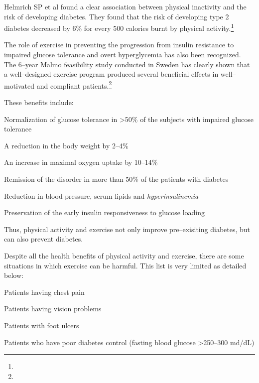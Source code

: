 Helmrich SP et al found a clear association between physical inactivity and the risk of developing diabetes. They found that the risk of developing type 2 diabetes decreased by 6\% for every 500 calories burnt by physical activity.\footnote{}

The role of exercise in preventing the progression from insulin resistance to impaired glucose tolerance and overt hyperglycemia has also been recognized. The 6–year Malmo feasibility study conducted in Sweden has clearly shown that a well–designed exercise program produced several beneficial effects in well–motivated and compliant patients.\footnote{}

These benefits include:

\item Normalization of glucose tolerance in \textgreater  50\% of the subjects with impaired glucose tolerance

 \item A reduction in the body weight by 2–4\%

 \item An increase in maximal oxygen uptake by 10–14\%

 \item Remission of the disorder in more than 50\% of the patients with diabetes

 \item Reduction in blood pressure, serum lipids and \textit{hyperinsulinemia}

 \item Preservation of the early insulin responsiveness to glucose loading

Thus, physical activity and exercise not only improve pre–exisiting diabetes, but can also prevent diabetes.


Despite all the health benefits of physical activity and exercise, there are some situations in which exercise can be harmful. This list is very limited as detailed below:

\item Patients having chest pain

 \item Patients having vision problems

 \item Patients with foot ulcers

 \item Patients who have poor diabetes control (fasting blood glucose \textgreater  250–300 md/dL)


